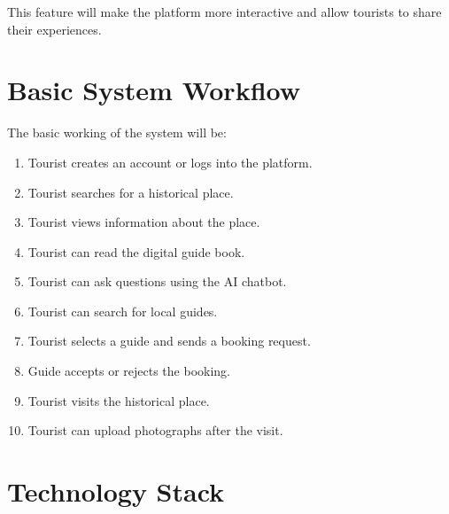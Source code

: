 \documentclass[12pt,a4paper]{article}
\begin{document}
This feature will make the platform more interactive and allow tourists
to share their experiences.



\section{Basic System Workflow}

The basic working of the system will be:

\begin{enumerate}[leftmargin=*]

    \item Tourist creates an account or logs into the platform.

    \item Tourist searches for a historical place.

    \item Tourist views information about the place.

    \item Tourist can read the digital guide book.

    \item Tourist can ask questions using the AI chatbot.

    \item Tourist can search for local guides.

    \item Tourist selects a guide and sends a booking request.

    \item Guide accepts or rejects the booking.

    \item Tourist visits the historical place.

    \item Tourist can upload photographs after the visit.

\end{enumerate}



\section{Technology Stack}
\end{document}
